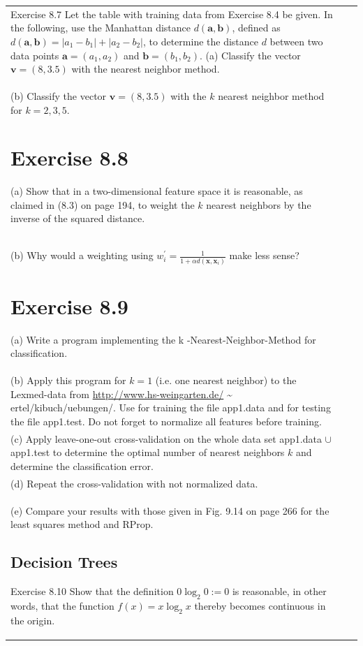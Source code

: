 \documentclass[10pt]{book}
\begin{document}
\begin{center}
\begin{tabular}{|l|l|l|}
Exercise 8.7 Let the table with training data from Exercise 8.4 be given. In the following, use the Manhattan distance $d(\boldsymbol{a}, \boldsymbol{b})$, defined as $d(\boldsymbol{a}, \boldsymbol{b}) = \lvert a_{1}-b_{1}\rvert + \lvert a_{2}-b_{2}\rvert$, to determine the distance $d$ between two data points $\boldsymbol{a}=(a_{1}, a_{2})$ and $\boldsymbol{b}=(b_{1}, b_{2})$.
(a) Classify the vector $\boldsymbol{v}=(8,3.5)$ with the nearest neighbor method.\\
(b) Classify the vector $\boldsymbol{v}=(8,3.5)$ with the $k$ nearest neighbor method for $k=2,3,5$.

\section{Exercise 8.8}
(a) Show that in a two-dimensional feature space it is reasonable, as claimed in (8.3) on page 194, to weight the $k$ nearest neighbors by the inverse of the squared distance.\\
(b) Why would a weighting using $w_{i}^{\prime}=\frac{1}{1+\alpha d\left(\boldsymbol{x}, \boldsymbol{x}_{i}\right)}$ make less sense?

\section{Exercise 8.9}
(a) Write a program implementing the k -Nearest-Neighbor-Method for classification.\\
(b) Apply this program for $k=1$ (i.e. one nearest neighbor) to the Lexmed-data from \href{http://www.hs-weingarten.de/}{http://www.hs-weingarten.de/} \~{} ertel/kibuch/uebungen/. Use for training the file app1.data and for testing the file app1.test. Do not forget to normalize all features before training.\\
(c) Apply leave-one-out cross-validation on the whole data set app1.data $\cup$ app1.test to determine the optimal number of nearest neighbors $k$ and determine the classification error.\\
(d) Repeat the cross-validation with not normalized data.\\
(e) Compare your results with those given in Fig. 9.14 on page 266 for the least squares method and RProp.

\subsection{Decision Trees}
Exercise 8.10 Show that the definition $0 \log _{2} 0:=0$ is reasonable, in other words, that the function $f(x)=x \log _{2} x$ thereby becomes continuous in the origin.


\end{tabular}
\end{center}
\end{document}
